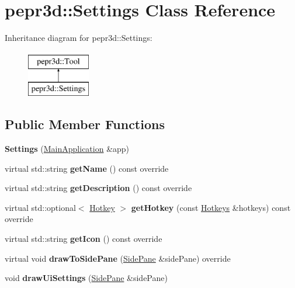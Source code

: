 \hypertarget{classpepr3d_1_1_settings}{}\section{pepr3d\+::Settings Class Reference}
\label{classpepr3d_1_1_settings}
Inheritance diagram for pepr3d\+::Settings\+:\begin{figure}[H]
\begin{center}
\leavevmode
\includegraphics[height=2.000000cm]{classpepr3d_1_1_settings}
\end{center}
\end{figure}
\subsection*{Public Member Functions}
\begin{DoxyCompactItemize}
\item 
\mbox{\label{classpepr3d_1_1_settings_a32bce083767edda443276c495665a1dc}} 
{\bfseries Settings} (\mbox{\hyperlink{classpepr3d_1_1_main_application}{Main\+Application}} \&app)
\item 
\mbox{\label{classpepr3d_1_1_settings_ab1cb768c5f1d54d9dd58534dd52fee9c}} 
virtual std\+::string {\bfseries get\+Name} () const override
\item 
\mbox{\label{classpepr3d_1_1_settings_af12e0a7190ff25d41a51b483ec661962}} 
virtual std\+::string {\bfseries get\+Description} () const override
\item 
\mbox{\label{classpepr3d_1_1_settings_a4146e189ce75f6703e498b85a83701a0}} 
virtual std\+::optional$<$ \mbox{\hyperlink{structpepr3d_1_1_hotkey}{Hotkey}} $>$ {\bfseries get\+Hotkey} (const \mbox{\hyperlink{classpepr3d_1_1_hotkeys}{Hotkeys}} \&hotkeys) const override
\item 
\mbox{\label{classpepr3d_1_1_settings_ab8db98e9aababb2f7a896d000bfd5069}} 
virtual std\+::string {\bfseries get\+Icon} () const override
\item 
\mbox{\label{classpepr3d_1_1_settings_a69cb0d00220487d9b5d1b3b8844db0a0}} 
virtual void {\bfseries draw\+To\+Side\+Pane} (\mbox{\hyperlink{classpepr3d_1_1_side_pane}{Side\+Pane}} \&side\+Pane) override
\item 
\mbox{\label{classpepr3d_1_1_settings_af1aed4fc1479b60b2cbe20e1d19a79ba}} 
void {\bfseries draw\+Ui\+Settings} (\mbox{\hyperlink{classpepr3d_1_1_side_pane}{Side\+Pane}} \&side\+Pane)
\end{DoxyCompactItemize}

